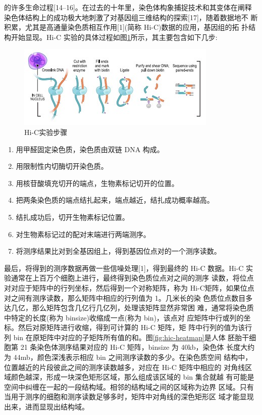 \documentclass[a4paper]{apa6}
\begin{document}
的许多生命过程[14–16]。在过去的十年里，染色体构象捕捉技术和其变体在阐释 染色体结构上的成功极大地刺激了对基因组三维结构的探索[17]，随着数据地不 断积累，尤其是高通量染色质相互作用[1](简称 Hi-C)数据的应用，基因组的拓 扑结构开始显现。Hi-C 实验的具体过程如图\ref{fig:hic-experiments}所示，其主要包含如下几步:

\begin{figure}[htbp]
\centering
\includegraphics[width=.9\linewidth]{./asset/hic-experiments.jpg}
\caption{\label{fig:hic-experiments}Hi-C实验步骤}
\end{figure}

\begin{enumerate}
\item 用甲醛固定染色质，染色质由双链 DNA 构成。
\item 用限制性内切酶切开染色质。
\item 用核苷酸填充切开的端点，生物素标记切开的位置。
\item 把两条染色质的端点结扎起来，端点越近，结扎成功概率越高。
\item 结扎成功后，切开生物素标记位置。
\item 对生物素标记过的配对末端进行两端测序。
\item 将测序结果比对到全基因组上，得到基因位点对的一个测序读数。
\end{enumerate}

最后，将得到的测序数据再做一些信噪处理[1]，得到最终的 Hi-C 数据。Hi-C 实验通常在上百万个细胞上进行，最终得到染色质位点对之间的测序
读数，将位点对对应于矩阵中的行列坐标，然后得到一个对称矩阵，称为 Hi-C矩阵，如果位点对之间有测序读数，那么矩阵中相应的行列值为 1。几米长的染 色质位点数目多达几亿，那么矩阵包含几亿行几亿列，处理该矩阵显然非常困 难，通常将染色质中特定的长度(称为 binsize)收缩成一点(称为 bin)，该点对 应矩阵中行或列的坐标。然后对原矩阵进行收缩，得到可计算的 Hi-C 矩阵，矩 阵中行列的值为该行列 bin 在原矩阵中对应的子矩阵所有值的和。图\ref{fig:hic-heatmap}是人体 胚胎干细胞第 21 条染色体测序结果对应的 Hi-C 矩阵，binsize 为 40kb，染色体 长度大约为 44mb，颜色深浅表示相应 bin 之间测序读数的多少。在染色质空间 结构中，位置越近的片段彼此之间的测序读数越多，对应在 Hi-C 矩阵中相应的 对角线区域颜色越深，形成一块深色矩形区域，那么组成该区域的 bin 集合就越 有可能是空间中纠缠在一起的一段结构域。相邻的结构域之间的区域称为边界 区域。只有当用于测序的细胞和测序读数足够多时，矩阵中对角线的深色矩形区 域才能显现出来，进而显现出结构域。
\end{document}

